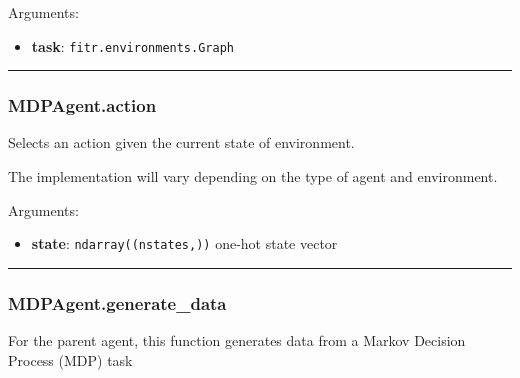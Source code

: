 Arguments:

\begin{itemize}
\tightlist
\item
  \textbf{task}: \texttt{fitr.environments.Graph}
\end{itemize}

\begin{center}\rule{0.5\linewidth}{\linethickness}\end{center}

\subsubsection{MDPAgent.action}\label{mdpagent.action}

\begin{Shaded}
\begin{Highlighting}[]
\end{Highlighting}
\end{Shaded}

Selects an action given the current state of environment.

The implementation will vary depending on the type of agent and
environment.

Arguments:

\begin{itemize}
\tightlist
\item
  \textbf{state}: \texttt{ndarray((nstates,))} one-hot state vector
\end{itemize}

\begin{center}\rule{0.5\linewidth}{\linethickness}\end{center}

\subsubsection{MDPAgent.generate\_data}\label{mdpagent.generate_data}

\begin{Shaded}
\begin{Highlighting}[]
\OperatorTok{=}\NormalTok{)}
\end{Highlighting}
\end{Shaded}

For the parent agent, this function generates data from a Markov
Decision Process (MDP) task

